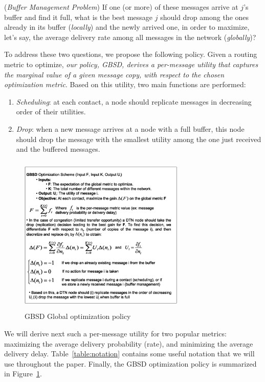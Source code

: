 (\emph{Buffer Management Problem}) If one (or more) of these messages arrive at $j$'s buffer and find it full, what is the best message $j$ should drop among the ones already in its buffer (\emph{locally}) and the newly arrived one, in order to maximize, let's say, the average delivery rate among all messages in the network (\emph{globally})?

To address these two questions, we propose the following policy. Given a routing metric to optimize, \emph{our policy, GBSD, derives a per-message utility that captures the \emph{marginal value} of a given message copy, with respect to the chosen optimization metric}. Based on this utility, two main functions are performed:

\begin{enumerate}
\item \emph{Scheduling}: at each contact, a node should replicate messages in decreasing order of their utilities.
\item \emph{Drop}: when a new message arrives at a node with a full buffer, this node should drop the message with the smallest utility among the one just received and the buffered messages.
\end{enumerate}

\begin{figure}[!h]
\centering
\includegraphics[width=3.1in,height=3in]{Chapitre3/GOS.eps}
\caption{GBSD Global optimization policy}
\label{GlobalOptimizationSchema}
\end{figure}

We will derive next such a per-message utility for two popular metrics: maximizing the average delivery probability (rate), and minimizing the average delivery delay. Table~\ref{table:notation} contains some useful notation that we will use throughout the paper. Finally, the GBSD optimization policy is summarized in Figure~\ref{GlobalOptimizationSchema}.

